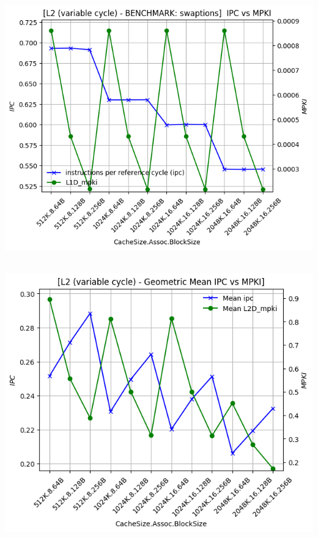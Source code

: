 \begin{minipage}{\textwidth}
    \begin{center}
        \\
        \vspace{3mm}
        \includegraphics[scale=0.65]{graphs/L2/var/swaptions.png}
        \vspace{6mm}
    \end{center}
\end{minipage}

\begin{minipage}{\textwidth}
    \begin{center}
        \\
        \vspace{3mm}
        \includegraphics[scale=0.60]{graphs/L2/var/mean.png}
        \vspace{6mm}
    \end{center}
\end{minipage}


